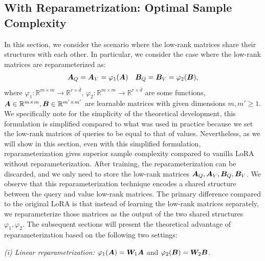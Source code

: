 
\subsection{With Reparametrization: Optimal Sample Complexity}
\label{sec:with_reparametrization}

In this section, we consider the scenario where the low-rank matrices share their structures with each other. In particular, we consider the case where the low-rank matrices are reparameterized as: 
\begin{align*}
{\bm A}_Q = {\bm A}_V = \varphi_1({{\bm A}}) && 
{\bm B}_Q = {\bm B}_V = \varphi_2({{\bm B}}),\end{align*}
where $\varphi_{1}:\mathbb{R}^{m \times m} \to \mathbb{R}^{r \times \bar{d}}$,  $\varphi_{2}:\mathbb{R}^{m \times m} \to \mathbb{R}^{r \times \bar{d}}$ are some functions,  ${\bm A} \in \mathbb{R}^{m \times m}, {\bm B} \in \mathbb{R}^{m' \times m'}$ are learnable matrices with given dimensions $m, m' \geq 1$. We specifically note for the simplicity of the theoretical development, this formulation is simplified compared to what was used in practice because we set the low-rank matrices of queries to be equal to that of values. Nevertheless, as we will show in this section, even with this simplified formulation, reparameterization gives superior sample complexity compared to vanilla LoRA without reparameterization. After training, the reparameterization can be discarded, and we only need to store the low-rank matrices ${\bm A}_Q, {\bm A}_V, {\bm B}_Q, {\bm B}_V$. We observe that this reparameterization technique encodes a shared structure between the query and value low-rank matrices. The primary difference compared to the original LoRA is that instead of learning the low-rank matrices separately, we reparameterize those matrices as the output of the two shared structures $\varphi_1, \varphi_2$. The subsequent sections will present the theoretical advantage of reparameterization based on the following two settings:

\emph{(i) Linear reparametrization:} $\varphi_1({{\bm A}})=\bm{W}_1{\bm A}$ and $\varphi_2({{\bm B}})=\bm{W}_2{\bm B}$.

